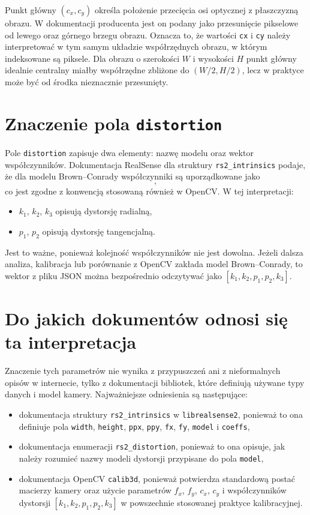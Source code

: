\documentclass[12pt,a4paper]{report}
\begin{document}
Punkt główny $(c_x, c_y)$ określa położenie przecięcia osi optycznej z płaszczyzną obrazu.
W dokumentacji producenta jest on podany jako przesunięcie pikselowe od lewego oraz górnego
brzegu obrazu. Oznacza to, że wartości \texttt{cx} i \texttt{cy} należy interpretować w tym
samym układzie współrzędnych obrazu, w którym indeksowane są piksele. Dla obrazu o szerokości
$W$ i wysokości $H$ punkt główny idealnie centralny miałby współrzędne zbliżone do
$(W/2, H/2)$, lecz w praktyce może być od środka nieznacznie przesunięty.

\section{Znaczenie pola \texttt{distortion}}
Pole \texttt{distortion} zapisuje dwa elementy: nazwę modelu oraz wektor współczynników.
Dokumentacja RealSense dla struktury \texttt{rs2\_intrinsics} podaje, że dla modelu
Brown--Conrady współczynniki są uporządkowane jako
\begin{equation}
    [k_1, k_2, p_1, p_2, k_3],
\end{equation}
co jest zgodne z konwencją stosowaną również w OpenCV. W tej interpretacji:
\begin{itemize}
    \item $k_1$, $k_2$, $k_3$ opisują dystorsję radialną,
    \item $p_1$, $p_2$ opisują dystorsję tangencjalną.
\end{itemize}

Jest to ważne, ponieważ kolejność współczynników nie jest dowolna. Jeżeli dalsza analiza,
kalibracja lub porównanie z OpenCV zakłada model Brown--Conrady, to wektor z pliku JSON można
bezpośrednio odczytywać jako $[k_1, k_2, p_1, p_2, k_3]$.

\section{Do jakich dokumentów odnosi się ta interpretacja}
Znaczenie tych parametrów nie wynika z przypuszczeń ani z nieformalnych opisów w internecie,
tylko z dokumentacji bibliotek, które definiują używane typy danych i model kamery.
Najważniejsze odniesienia są następujące:
\begin{itemize}
    \item dokumentacja struktury \texttt{rs2\_intrinsics} w \texttt{librealsense2}, ponieważ to ona
        definiuje pola \texttt{width}, \texttt{height}, \texttt{ppx}, \texttt{ppy}, \texttt{fx}, \texttt{fy},
        \texttt{model} i \texttt{coeffs},
    \item dokumentacja enumeracji \texttt{rs2\_distortion}, ponieważ to ona opisuje, jak należy rozumieć
        nazwy modeli dystorsji przypisane do pola \texttt{model},
    \item dokumentacja OpenCV \texttt{calib3d}, ponieważ potwierdza standardową postać macierzy kamery
        oraz użycie parametrów $f_x$, $f_y$, $c_x$, $c_y$ i współczynników dystorsji
        $[k_1, k_2, p_1, p_2, k_3]$ w powszechnie stosowanej praktyce kalibracyjnej.
\end{itemize}
\end{document}
